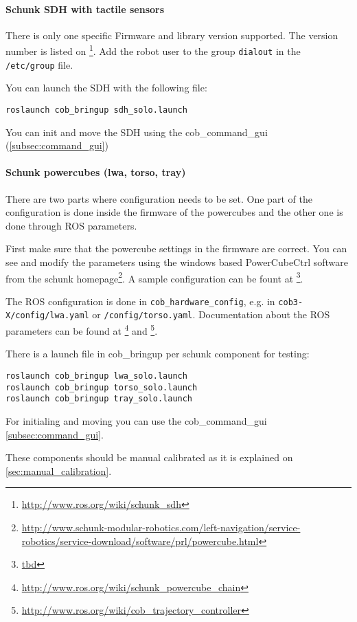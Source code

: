 \paragraph{Schunk SDH with tactile sensors}
There is only one specific Firmware and library version supported. The version number is listed on \footnote{\url{http://www.ros.org/wiki/schunk_sdh}}. Add the robot user to the group \texttt{dialout} in the \texttt{/etc/group} file.

You can launch the SDH with the following file:
\begin{lstlisting}
roslaunch cob_bringup sdh_solo.launch
\end{lstlisting}

You can init and move the SDH using the cob\_command\_gui (\ref{subsec:command_gui})

\paragraph{Schunk powercubes (lwa, torso, tray)}
There are two parts where configuration needs to be set. One part of the configuration is done inside the firmware of the powercubes and the other one is done through ROS parameters.

First make sure that the powercube settings in the firmware are correct. You can see and modify the parameters using the windows based PowerCubeCtrl software from the schunk homepage\footnote{\url{http://www.schunk-modular-robotics.com/left-navigation/service-robotics/service-download/software/prl/powercube.html}}. A sample configuration can be fount at \footnote{\url{tbd}}.

The ROS configuration is done in \texttt{cob\_hardware\_config}, e.g. in \texttt{cob3-X/config/lwa.yaml} or \texttt{/config/torso.yaml}. Documentation about the ROS parameters can be found at \footnote{\url{http://www.ros.org/wiki/schunk_powercube_chain}} and \footnote{\url{http://www.ros.org/wiki/cob_trajectory_controller}}.

There is a launch file in cob\_bringup per schunk component for testing:

\begin{lstlisting}
roslaunch cob_bringup lwa_solo.launch
roslaunch cob_bringup torso_solo.launch
roslaunch cob_bringup tray_solo.launch
\end{lstlisting}

For initialing and moving you can use the cob\_command\_gui \ref{subsec:command_gui}.

These components should be manual calibrated as it is explained on \ref{sec:manual_calibration}.

